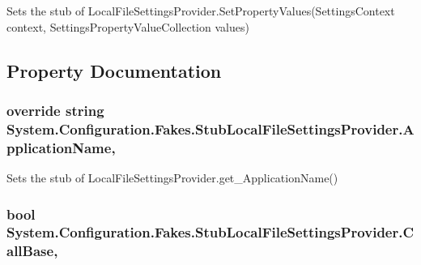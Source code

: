Sets the stub of Local\-File\-Settings\-Provider.\-Set\-Property\-Values(\-Settings\-Context context, Settings\-Property\-Value\-Collection values)



\subsection{Property Documentation}
\hypertarget{class_system_1_1_configuration_1_1_fakes_1_1_stub_local_file_settings_provider_a649047c0f52d093bd5f410030531fea8}{
\subsubsection[{Application\-Name}]{\setlength{\rightskip}{0pt plus 5cm}override string System.\-Configuration.\-Fakes.\-Stub\-Local\-File\-Settings\-Provider.\-Application\-Name\hspace{0.3cm}{\ttfamily [get]}, {\ttfamily [set]}}}\label{class_system_1_1_configuration_1_1_fakes_1_1_stub_local_file_settings_provider_a649047c0f52d093bd5f410030531fea8}


Sets the stub of Local\-File\-Settings\-Provider.\-get\-\_\-\-Application\-Name()

\hypertarget{class_system_1_1_configuration_1_1_fakes_1_1_stub_local_file_settings_provider_a5ca3555caf680d27a3cd22b4a5126ff3}{
\subsubsection[{Call\-Base}]{\setlength{\rightskip}{0pt plus 5cm}bool System.\-Configuration.\-Fakes.\-Stub\-Local\-File\-Settings\-Provider.\-Call\-Base\hspace{0.3cm}{\ttfamily [get]}, {\ttfamily [set]}}}\label{class_system_1_1_configuration_1_1_fakes_1_1_stub_local_file_settings_provider_a5ca3555caf680d27a3cd22b4a5126ff3}


